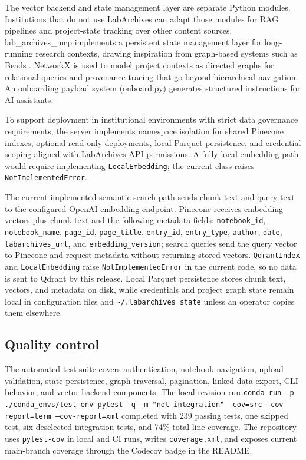 \documentclass{josr}
\begin{document}
The vector backend and state management layer are separate Python modules. Institutions that do not use LabArchives can adapt those modules for RAG pipelines and project-state tracking over other content sources. lab\_archives\_mcp implements a persistent state management layer for long-running research contexts, drawing inspiration from graph-based systems such as Beads \cite{beads}. NetworkX is used to model project contexts as directed graphs for relational queries and provenance tracing that go beyond hierarchical navigation. An onboarding payload system (onboard.py) generates structured instructions for AI assistants.

To support deployment in institutional environments with strict data governance requirements, the server implements namespace isolation for shared Pinecone indexes, optional read-only deployments, local Parquet persistence, and credential scoping aligned with LabArchives API permissions. A fully local embedding path would require implementing \texttt{LocalEmbedding}; the current class raises \texttt{NotImplementedError}.

The current implemented semantic-search path sends chunk text and query text to the configured OpenAI embedding endpoint. Pinecone receives embedding vectors plus chunk text and the following metadata fields: \texttt{notebook\_id}, \texttt{notebook\_name}, \texttt{page\_id}, \texttt{page\_title}, \texttt{entry\_id}, \texttt{entry\_type}, \texttt{author}, \texttt{date}, \texttt{labarchives\_url}, and \texttt{embedding\_version}; search queries send the query vector to Pinecone and request metadata without returning stored vectors. \texttt{QdrantIndex} and \texttt{LocalEmbedding} raise \texttt{NotImplementedError} in the current code, so no data is sent to Qdrant by this release. Local Parquet persistence stores chunk text, vectors, and metadata on disk, while credentials and project graph state remain local in configuration files and \texttt{\textasciitilde{}/.labarchives\_state} unless an operator copies them elsewhere.

\subsection*{Quality control}
The automated test suite covers authentication, notebook navigation, upload validation, state persistence, graph traversal, pagination, linked-data export, CLI behavior, and vector-backend components. The local revision run \texttt{conda run -p ./conda\_envs/test-env pytest -q -m "not integration" --cov=src --cov-report=term --cov-report=xml} completed with 239 passing tests, one skipped test, six deselected integration tests, and 74\% total line coverage. The repository uses \texttt{pytest-cov} in local and CI runs, writes \texttt{coverage.xml}, and exposes current main-branch coverage through the Codecov badge in the README.
\end{document}
